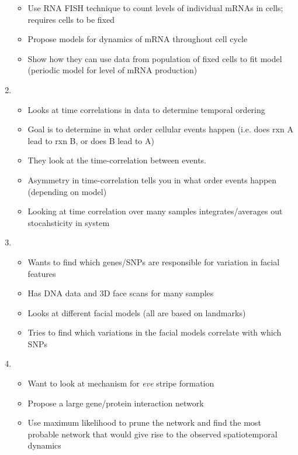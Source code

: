\documentclass[12pt]{article}
\begin{document}
\begin{enumerate}
\begin{itemize}
	\item Use RNA FISH technique to count levels of individual mRNAs in cells; requires cells to be fixed
	\item Propose models for dynamics of mRNA throughout cell cycle
	\item Show how they can use data from population of fixed cells to fit model (periodic model for level of mRNA production)
\end{itemize}

\item {}
\begin{itemize}
	\item Looks at time correlations in data to determine temporal ordering
	\item Goal is to determine in what order cellular events happen (i.e. does rxn A lead to rxn B, or does B lead to A)
	\item They look at the time-correlation between events.
	\item Asymmetry in time-correlation tells you in what order events happen (depending on model)
	\item Looking at time correlation over many samples integrates/averages out stocahsticity in system
\end{itemize}

\item {}
\begin{itemize}
	\item Wants to find which genes/SNPs are responsible for variation in facial features
	\item Has DNA data and 3D face scans for many samples
	\item Looks at different facial models (all are based on landmarks)
	\item Tries to find which variations in the facial models correlate with which SNPs
\end{itemize}

\item {}
\begin{itemize}
	\item Want to look at mechanism for {\em eve} stripe formation
	\item Propose a large gene/protein interaction network
	\item Use maximum likelihood to prune the network and find the most probable network that would give rise to the observed spatiotemporal dynamics
\end{itemize}


\end{enumerate}
\end{document}
